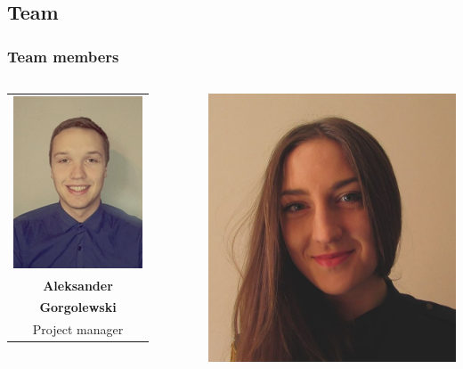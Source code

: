 \documentclass[xcolor=dvipsnames]{beamer}%
\begin{document}
\subsection{Team} %
\begin{frame} %
\frametitle{Team members}

\begin{columns}

\begin{minipage}[c][0.45\textheight][c]{\linewidth}
  \centering
    \begin{table}[H]
    \centering
    \begin{tabular}{c}
    \includegraphics[height=0.2\textheight]{figure/Gorgolewski.jpg}\\
    \textbf{Aleksander}\\\textbf{Gorgolewski}\\
    Project manager
    \end{tabular}
    \end{table}
\end{minipage}
\begin{minipage}[c][0.3\textheight][c]{\linewidth}
  \centering
    \includegraphics[height=0.2\textheight]{figure/ada.png}\\

\end{minipage}
\end{columns}
\end{frame}
\end{document}
